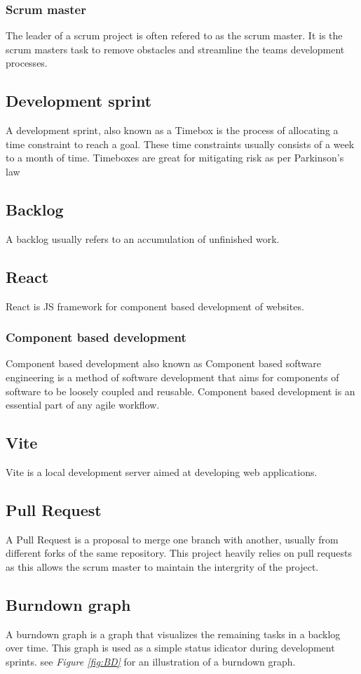 \documentclass[12pt]{article}
\begin{document}
\subsubsection{Scrum master}
The leader of a scrum project is often refered to as the scrum master.
It is the scrum masters task to remove obstacles and streamline the teams development processes.
\subsection{Development sprint\cite{Timeboxing2024}}
A development sprint, also known as a Timebox is the process of allocating a time constraint to
reach a goal. These time constraints usually consists of a week to a month of time.
Timeboxes are great for mitigating risk as per Parkinson's law\cite{ParkinsonLaw2024}
\subsection{Backlog\cite{Backlog2022}}
A backlog usually refers to an accumulation of unfinished work.
\subsection{React\cite{React}}
React is JS\cite{ECMA262} framework for component based development of websites.
\subsubsection{Component based development\cite*{ComponentbasedSoftwareEngineering2024}}
Component based development also known as Component based software engineering is a method of software development
that aims for components of software to be loosely coupled and reusable. Component based development is an 
essential part of any agile workflow.
\subsection{Vite\cite{Vite}}
Vite is a local development server aimed at developing web applications.
\subsection{Pull Request\cite{PullRequests}}
A Pull Request is a proposal to merge one branch with another, usually from different forks of the same repository.
This project heavily relies on pull requests as this allows the scrum master to maintain the intergrity of the project.
\subsection{Burndown graph\cite{BurndownChart2024}}
A burndown graph is a graph that visualizes the remaining tasks in a backlog over time.
This graph is used as a simple status idicator during development sprints.
see \textit{Figure \ref{fig:BD}} for an illustration of a burndown graph.
\end{document}
